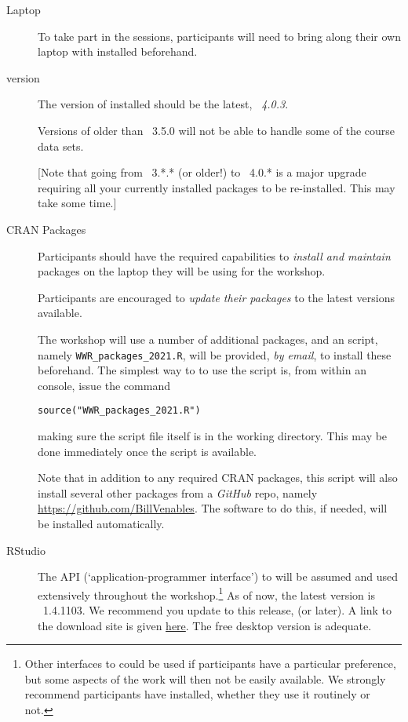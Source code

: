 \documentclass[12pt]{article}
\begin{document}
\begin{description}
\item[Laptop] To take part in the sessions, participants will need to
  bring along their own laptop with \R installed beforehand.
  
\item[\R version] The version of \R installed should be the latest,
  \emph{\R~4.0.3}.

  Versions of \R older than \R~3.5.0 will not be able to
  handle some of the course data sets.

  [Note that going from \R~3.*.* (or older!) to \R~4.0.* is a major
  upgrade requiring all your currently installed packages to be
  re-installed. This may take some time.]

\item[CRAN Packages] Participants should have the required
  capabilities to \emph{install and maintain} \R packages on the
  laptop they will be using for the workshop.

  Participants are encouraged to \emph{update their packages} to the
  latest versions available.

  The workshop will use a number of additional \R packages, and
  an \R script, namely \verb|WWR_packages_2021.R|, will be provided,
  \emph{by email}, to install these beforehand. The simplest way to
  to use the script is, from within an \R console, issue the command

  \verb|source("WWR_packages_2021.R")|

  making sure the script file itself is in the \R working directory.
  This may be done immediately once the script is available.

  Note that in addition to any required CRAN packages, this script
  will also install several other packages from a \emph{GitHub} repo,
  namely \url{https://github.com/BillVenables}.  The software to do
  this, if needed, will be installed automatically.

  
\item[RStudio] The \RStudio API (`application-programmer interface')
  to \R will be assumed and used extensively throughout the
  workshop.\footnote{Other interfaces to \R could be used if
    participants have a particular preference, but some aspects of the
    work will then not be easily available.  We strongly recommend
    participants have \RStudio installed, whether they use it
    routinely or not.}  As of now, the latest version is
  \RStudio~1.4.1103.  We recommend you update to this release, (or
  later).  A link to the download site is given
  \href{https://rstudio.com/products/rstudio/download/}{here}. The
  free desktop version is adequate.


\end{description}
\end{document}
